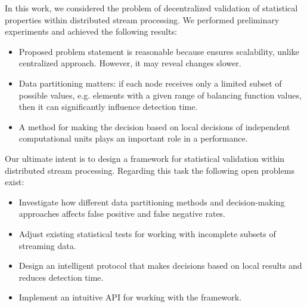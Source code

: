 \label {fs-short-conclusion}

In this work, we considered the problem of decentralized validation of statistical properties within distributed stream processing. We performed preliminary experiments and achieved the following results:
\begin{itemize}
    \item Proposed problem statement is reasonable because ensures scalability, unlike centralized approach. However, it may reveal changes slower.
    \item Data partitioning matters: if each node receives only a limited subset of possible values, e.g. elements with a given range of balancing function values, then it can significantly influence detection time.
    \item A method for making the decision based on local decisions of independent computational units plays an important role in a performance.
\end{itemize}

Our ultimate intent is to design a framework for statistical validation within distributed stream processing. Regarding this task the following open problems exist:

\begin{itemize}
    \item Investigate how different data partitioning methods and decision-making approaches affects false positive and false negative rates.
    \item Adjust existing statistical tests for working with incomplete subsets of streaming data.
    \item Design an intelligent protocol that makes decisions based on local results and reduces detection time.
    \item Implement an intuitive API for working with the framework.
\end{itemize}
